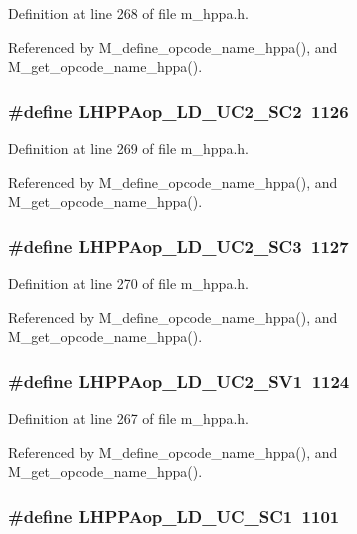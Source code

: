 Definition at line 268 of file m\_\-hppa.h.

Referenced by M\_\-define\_\-opcode\_\-name\_\-hppa(), and M\_\-get\_\-opcode\_\-name\_\-hppa().
\subsubsection{\setlength{\rightskip}{0pt plus 5cm}\#define LHPPAop\_\-LD\_\-UC2\_\-SC2~1126}\label{m__hppa_8h_7510a07ec3c4b5e18cae34960ede106b}




Definition at line 269 of file m\_\-hppa.h.

Referenced by M\_\-define\_\-opcode\_\-name\_\-hppa(), and M\_\-get\_\-opcode\_\-name\_\-hppa().
\subsubsection{\setlength{\rightskip}{0pt plus 5cm}\#define LHPPAop\_\-LD\_\-UC2\_\-SC3~1127}\label{m__hppa_8h_333506183177b9a90753dca0aa5c0f98}




Definition at line 270 of file m\_\-hppa.h.

Referenced by M\_\-define\_\-opcode\_\-name\_\-hppa(), and M\_\-get\_\-opcode\_\-name\_\-hppa().
\subsubsection{\setlength{\rightskip}{0pt plus 5cm}\#define LHPPAop\_\-LD\_\-UC2\_\-SV1~1124}\label{m__hppa_8h_29aa3314ff08025ceddc6e64c5500862}




Definition at line 267 of file m\_\-hppa.h.

Referenced by M\_\-define\_\-opcode\_\-name\_\-hppa(), and M\_\-get\_\-opcode\_\-name\_\-hppa().
\subsubsection{\setlength{\rightskip}{0pt plus 5cm}\#define LHPPAop\_\-LD\_\-UC\_\-SC1~1101}\label{m__hppa_8h_6ca41e0d189365c5cda09d39814c3fa0}




